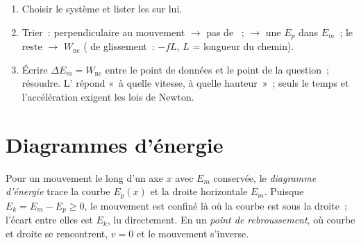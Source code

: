 \begin{method}\label{met:g12:work-and-energy:audit}
\begin{enumerate}
  \item Choisir le système et lister les  sur lui.
  \item Trier~: perpendiculaire au mouvement $\to$ pas de
        ~;  $\to$ une $E_p$
        dans $E_m$~; le reste $\to$ $W_{\text{nc}}$
        ( de glissement~: $-fL$, $L$ = longueur du
        chemin).
  \item Écrire $\Delta E_m = W_{\text{nc}}$ entre le point de données
        et le point de la question~; résoudre.
        L' répond «~à quelle vitesse, à quelle
        hauteur~»~; seuls le temps et l'accélération exigent les
        lois de Newton.
\end{enumerate}
\end{method}

\section{Diagrammes d'énergie}

\begin{definition}\label{def:g12:work-and-energy:diagram}
Pour un mouvement le long d'un axe $x$ avec $E_m$ conservée, le
\emph{diagramme d'énergie} trace la
courbe $E_p(x)$ et la droite horizontale $E_m$. Puisque
$E_k = E_m - E_p \geq 0$, le mouvement est confiné là où la courbe
est sous la droite~; l'écart entre elles est $E_k$, lu
directement. En un \emph{point de rebroussement}, où courbe et droite se rencontrent, $v = 0$ et le
mouvement s'inverse.
\end{definition}

